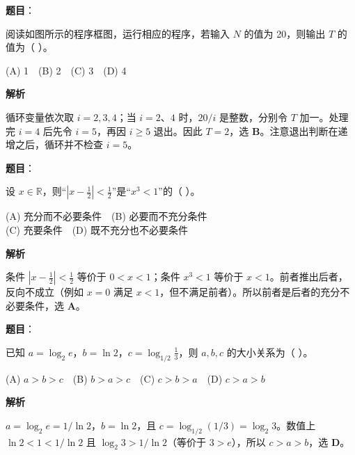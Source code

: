 \begin{answer}

\textbf{题目}：

阅读如图所示的程序框图，运行相应的程序，若输入 $N$ 的值为 20，则输出 $T$ 的值为（ ）。
\nopagebreak[4]
\begin{center}\end{center}
\nopagebreak[4]
(A) 1　(B) 2　(C) 3　(D) 4

\textbf{解析}

循环变量依次取 $i=2,3,4$；当 $i=2$、$4$ 时，$20/i$ 是整数，分别令 $T$ 加一。处理完 $i=4$ 后先令 $i=5$，再因 $i\ge 5$ 退出。因此 $T=2$，选 \textbf{B}。注意退出判断在递增之后，循环并不检查 $i=5$。


\end{answer}
\begin{answer}

\textbf{题目}：

设 $x\in\mathbb R$，则“$\left|x-\frac12\right|<\frac12$”是“$x^3<1$”的（ ）。

(A) 充分而不必要条件　(B) 必要而不充分条件\\
(C) 充要条件　(D) 既不充分也不必要条件

\textbf{解析}

条件 $|x-\tfrac12|<\tfrac12$ 等价于 $0<x<1$；条件 $x^3<1$ 等价于 $x<1$。前者推出后者，反向不成立（例如 $x=0$ 满足 $x<1$，但不满足前者）。所以前者是后者的充分不必要条件，选 \textbf{A}。


\end{answer}
\begin{answer}

\textbf{题目}：

已知 $a=\log_2 e$，$b=\ln2$，$c=\log_{1/2}\frac13$，则 $a,b,c$ 的大小关系为（ ）。

(A) $a>b>c$　(B) $b>a>c$　(C) $c>b>a$　(D) $c>a>b$

\textbf{解析}

$a=\log_2e=1/\ln2$，$b=\ln2$，且 $c=\log_{1/2}(1/3)=\log_2 3$。数值上 $\ln2<1<1/\ln2$ 且 $\log_2 3>1/\ln2$（等价于 $3>e$），所以 $c>a>b$，选 \textbf{D}。


\end{answer}
